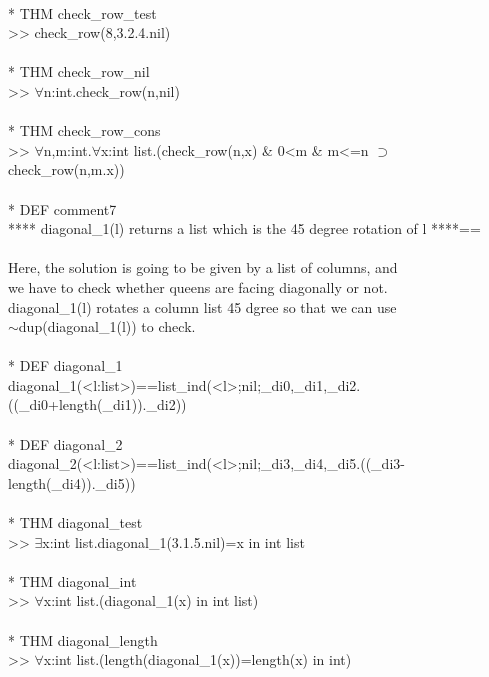 \N{} \\{}
\N{}* THM check\_row\_test \\{}
\N{}      >> check\_row(8,3.2.4.nil) \\{}
\N{} \\{}
\N{}* THM check\_row\_nil \\{}
\N{}      >> \(\forall{}\)n:int.check\_row(n,nil) \\{}
\N{} \\{}
\N{}* THM check\_row\_cons \\{}
\N{}      >> \(\forall{}\)n,m:int.\(\forall{}\)x:int list.(check\_row(n,x) \& 0<m \& m<=n \(\supset{}\) check\_row(n,m.x)) \\{}
\N{} \\{}
\N{}* DEF comment7 \\{}
\N{}      **** diagonal\_1(l) returns a list which is the 45 degree rotation of l ****== \\{}
\N{}       \\{}
\N{}      Here, the solution is going to be given by a list of columns, and \\{}
\N{}      we have to check whether queens are facing diagonally or not. \\{}
\N{}      diagonal\_1(l) rotates a column list 45 dgree so that we can use \\{}
\N{}      \(\sim{}\)dup(diagonal\_1(l)) to check. \\{}
\N{} \\{}
\N{}* DEF diagonal\_1 \\{}
\N{}      diagonal\_1(<l:list>)==list\_ind(<l>;nil;\_di0,\_di1,\_di2.((\_di0+length(\_di1)).\_di2)) \\{}
\N{} \\{}
\N{}* DEF diagonal\_2 \\{}
\N{}      diagonal\_2(<l:list>)==list\_ind(<l>;nil;\_di3,\_di4,\_di5.((\_di3-length(\_di4)).\_di5)) \\{}
\N{} \\{}
\N{}* THM diagonal\_test \\{}
\N{}      >> \(\exists{}\)x:int list.diagonal\_1(3.1.5.nil)=x in int list \\{}
\N{} \\{}
\N{}* THM diagonal\_int \\{}
\N{}      >> \(\forall{}\)x:int list.(diagonal\_1(x) in int list) \\{}
\N{} \\{}
\N{}* THM diagonal\_length \\{}
\N{}      >> \(\forall{}\)x:int list.(length(diagonal\_1(x))=length(x) in int) \\{}
